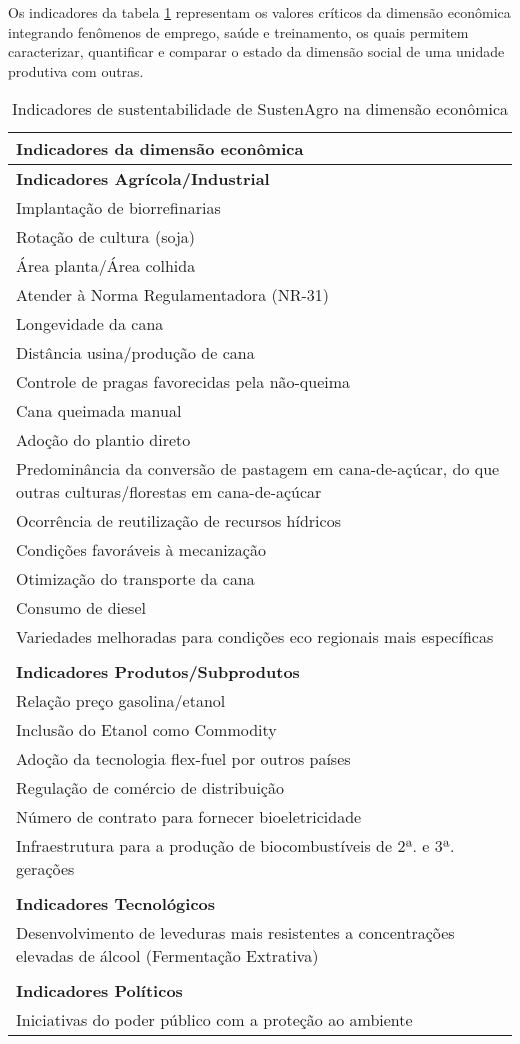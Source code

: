Os indicadores da tabela \ref{tab:Indicadores-de-sustentabilidade-economica}
representam os valores críticos da dimensão econômica integrando fenômenos
de emprego, saúde e treinamento, os quais permitem caracterizar, quantificar
e comparar o estado da dimensão social de uma unidade produtiva com
outras.

\begin{table}[h]
\begin{tabular}{|>{\raggedright}p{14cm}|}
\hline 
\textbf{Indicadores da dimensão econômica}\tabularnewline
\hline 
\hline 
\textbf{Indicadores Agrícola/Industrial}\tabularnewline
\hline 
Implantação de biorrefinarias\tabularnewline
\hline 
Rotação de cultura (soja)\tabularnewline
\hline 
Área planta/Área colhida\tabularnewline
\hline 
Atender à Norma Regulamentadora (NR-31)\tabularnewline
\hline 
Longevidade da cana\tabularnewline
\hline 
Distância usina/produção de cana\tabularnewline
\hline 
Controle de pragas favorecidas pela não-queima\tabularnewline
\hline 
Cana queimada manual\tabularnewline
\hline 
Adoção do plantio direto\tabularnewline
\hline 
Predominância da conversão de pastagem em cana-de-açúcar, do que outras
culturas/florestas em cana-de-açúcar\tabularnewline
\hline 
Ocorrência de reutilização de recursos hídricos\tabularnewline
\hline 
Condições favoráveis à mecanização\tabularnewline
\hline 
Otimização do transporte da cana\tabularnewline
\hline 
Consumo de diesel\tabularnewline
\hline 
Variedades melhoradas para condições eco regionais mais específicas\tabularnewline
\hline 
\tabularnewline
\hline 
\textbf{Indicadores Produtos/Subprodutos}\tabularnewline
\hline 
Relação preço gasolina/etanol\tabularnewline
\hline 
Inclusão do Etanol como Commodity\tabularnewline
\hline 
Adoção da tecnologia flex-fuel por outros países\tabularnewline
\hline 
Regulação de comércio de distribuição\tabularnewline
\hline 
Número de contrato para fornecer bioeletricidade\tabularnewline
\hline 
Infraestrutura para a produção de biocombustíveis de 2ª. e 3ª. gerações\tabularnewline
\hline 
\tabularnewline
\hline 
\textbf{Indicadores Tecnológicos}\tabularnewline
\hline 
Desenvolvimento de leveduras mais resistentes a concentrações elevadas
de álcool (Fermentação Extrativa)\tabularnewline
\hline 
\tabularnewline
\hline 
\textbf{Indicadores Políticos}\tabularnewline
\hline 
Iniciativas do poder público com a proteção ao ambiente\tabularnewline
\hline 
\end{tabular}

\caption{Indicadores de sustentabilidade de SustenAgro na dimensão econômica\label{tab:Indicadores-de-sustentabilidade-economica}}
\end{table}

